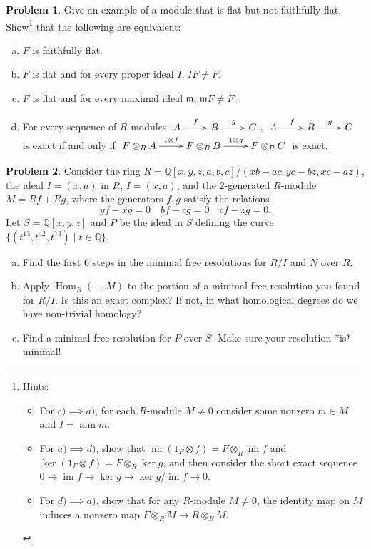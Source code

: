 \documentclass[11pt]{article}
\DeclareMathOperator{\Hom}{Hom}
\DeclareMathOperator{\im}{im}
\newcommand{\m}{\mathfrak{m}}
\DeclareMathOperator{\ann}{ann}
\theoremstyle{definition}
\newtheorem{problem}{Problem}
\begin{document}
\begin{problem} Give an example of a module that is flat but not faithfully flat. Show\footnote{Hints: \begin{itemize}
	\item For $c) \implies a)$, for each $R$-module $M \neq 0$ consider some nonzero $m \in M$ and $I = \ann m$. 
	\item For $a) \implies d)$, show that $\im(1_F \otimes f) = F \otimes_R \im f$ and $\ker(1_F \otimes f) = F \otimes_R \ker g$, and then consider the short exact sequence $0 \longrightarrow \im f \longrightarrow \ker g \longrightarrow \ker g/\im f \longrightarrow 0$. 
	\item For $d) \implies a)$, show that for any $R$-module $M \neq 0$, the identity map on $M$ induces a nonzero map $F \otimes_R M \longrightarrow R \otimes_R M$.
\end{itemize}}
 that the following are equivalent:	
\begin{enumerate}[a)]
		\item $F$ is faithfully flat.
		\item $F$ is flat and for every proper ideal $I$, $IF \neq F$.
		\item $F$ is flat and for every maximal ideal $\m$, $\m F \neq F$.
		\item For every sequence of $R$-modules $\xymatrix{A \ar[r]^-f & B \ar[r]^-g & C}$, $\xymatrix{A \ar[r]^-f & B \ar[r]^-g & C}$ is exact if and only if $\xymatrix{F \otimes_R A \ar[r]^-{1 \otimes f} & F \otimes_R B \ar[r]^-{1 \otimes g} & F \otimes_R C}$ is exact.
	\end{enumerate}
\end{problem}

\vspace{2em}

\begin{problem}
	Consider the ring $R = \mathbb{Q}[x,y,z,a,b,c]/(xb-ac,yc-bz,xc-az)$, the ideal $I = (x,a)$ in $R$, $I = (x,a)$, and the $2$-generated $R$-module $M = Rf + Rg$, where the generators $f, g$ satisfy the relations 
		$$yf-xg = 0 \quad bf - cg = 0 \quad cf - zg = 0.$$
		Let $S = \mathbb{Q}[x,y,z]$ and $P$ be the ideal in $S$ defining the curve $\lbrace (t^{13},t^{42},t^{73}) \mid t \in \mathbb{Q} \rbrace$.
		\begin{enumerate}[a)]
			\item Find the first $6$ steps in the minimal free resolutions for $R/I$ and $N$ over $R$.
			\item Apply $\Hom_R(-,M)$ to the portion of a minimal free resolution you found for $R/I$. Is this an exact complex? If not, in what homological degrees do we have non-trivial homology? 
			\item Find a minimal free resolution for $P$ over $S$. Make sure your resolution *is* minimal!
		\end{enumerate}
\end{problem}
\end{document}
